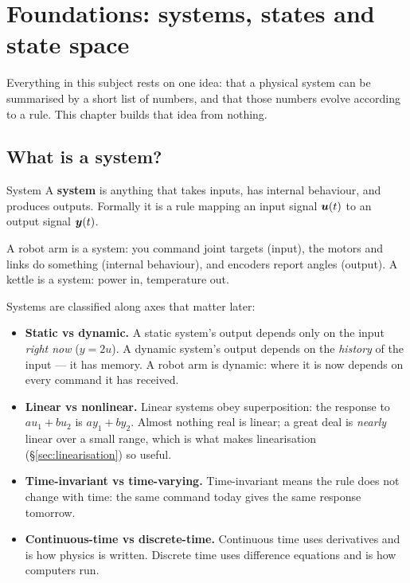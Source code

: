 \chapter{Foundations: systems, states and state space}

Everything in this subject rests on one idea: that a physical system can be summarised by a short list of
numbers, and that those numbers evolve according to a rule. This chapter builds that idea from nothing.

\section{What is a system?}

\begin{definition}{System}
A \textbf{system} is anything that takes inputs, has internal behaviour, and produces outputs. Formally it
is a rule mapping an input signal $\bm{u}(t)$ to an output signal $\bm{y}(t)$.
\end{definition}

\begin{intuition}
A robot arm is a system: you command joint targets (input), the motors and links do something (internal
behaviour), and encoders report angles (output). A kettle is a system: power in, temperature out.
\end{intuition}

Systems are classified along axes that matter later:

\begin{itemize}
\item \textbf{Static vs dynamic.} A static system's output depends only on the input \emph{right now}
      ($y = 2u$). A dynamic system's output depends on the \emph{history} of the input --- it has memory.
      A robot arm is dynamic: where it is now depends on every command it has received.
\item \textbf{Linear vs nonlinear.} Linear systems obey superposition: the response to $a u_1 + b u_2$ is
      $a y_1 + b y_2$. Almost nothing real is linear; a great deal is \emph{nearly} linear over a small
      range, which is what makes linearisation (\S\ref{sec:linearisation}) so useful.
\item \textbf{Time-invariant vs time-varying.} Time-invariant means the rule does not change with time:
      the same command today gives the same response tomorrow.
\item \textbf{Continuous-time vs discrete-time.} Continuous time uses derivatives and is how physics is
      written. Discrete time uses difference equations and is how computers run.
\end{itemize}


